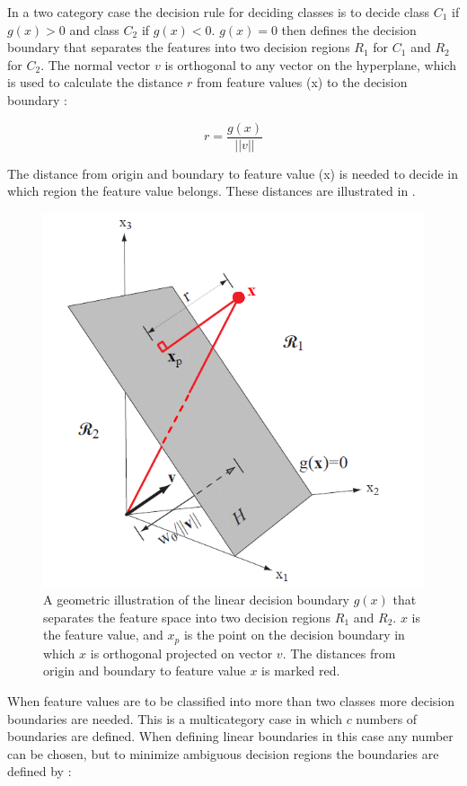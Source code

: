 In a two category case the decision rule for deciding classes is to decide class $C_1$ if $g(x) > 0$ and class $C_2$ if $g(x) < 0$. $g(x) = 0$ then defines the decision boundary that separates the features into two decision regions $R_1$ for $C_1$ and $R_2$ for $C_2$. The normal vector $v$ is orthogonal to any vector on the hyperplane, which is used to calculate the distance $r$ from feature values (x) to the decision boundary \cite{Duda2000}:

\begin{equation} \label{eq:featureValueDistance}
r = \frac{g(x)}{||v||}
\end{equation} 

The distance from origin and boundary to feature value (x) is needed to decide in which region the feature value belongs. \cite{Duda2000} These distances are illustrated in .

\begin{figure}[H]                 
	\includegraphics[width=.4\textwidth]{figures/xBackground/geolda}  
	\caption{A geometric illustration of the linear decision boundary $g(x)$ that separates the feature space into two decision regions $R_1$ and $R_2$. $x$ is the feature value, and $x_p$ is the point on the decision boundary in which $x$ is orthogonal projected on vector $v$. The distances from origin and boundary to feature value $x$ is marked red. \cite{Duda2000}}
	\label{fig:geolda} 
\end{figure}

When feature values are to be classified into more than two classes more decision boundaries are needed. This is a multicategory case in which $c$ numbers of boundaries are defined. When defining linear boundaries in this case any number can be chosen, but to minimize ambiguous decision regions the boundaries are defined by \cite{Duda2000}:

